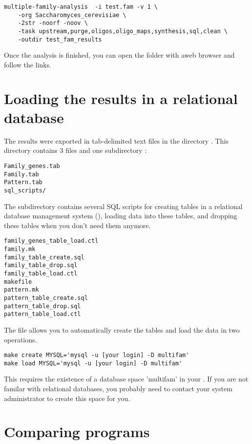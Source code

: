 \begin{verbatim}
multiple-family-analysis  -i test.fam -v 1 \
    -org Saccharomyces_cerevisiae \
    -2str -noorf -noov \
    -task upstream,purge,oligos,oligo_maps,synthesis,sql,clean \
    -outdir test_fam_results
\end{verbatim}

Once the analysis is finished, you can open the folder
\file{synthetic\_tables} with aweb browser and follow the links.

\section{Loading the results in a relational database}

The results were exported in tab-delimited text files in the directory
. This directory contains 3 files
and one subdirectory :

\begin{verbatim}
Family_genes.tab
Family.tab
Pattern.tab
sql_scripts/
\end{verbatim}

The subdirectory  contains several SQL scripts for creating
tables in a relational database management system (),
loading data into these tables, and dropping these tables when you
don't need them anymore.

\begin{verbatim}
family_genes_table_load.ctl
family.mk
family_table_create.sql
family_table_drop.sql
family_table_load.ctl
makefile
pattern.mk
pattern_table_create.sql
pattern_table_drop.sql
pattern_table_load.ctl
\end{verbatim}

The file  allows you to automatically create the tables
and load the data in two operations.

\begin{verbatim}
make create MYSQL='mysql -u [your login] -D multifam'
make load MYSQL='mysql -u [your login] -D multifam'
\end{verbatim}

This requires the existence of a database space 'multifam' in your
\concept{RDBMS}. If you are not familar with relational databases, you
probably need to contact your system administrator to create this
space for you.


\section{Comparing programs}

